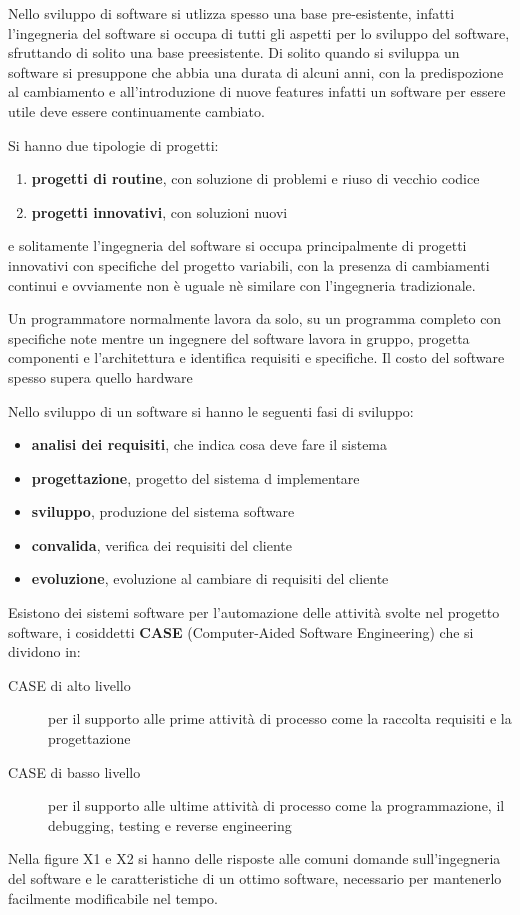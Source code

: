 \documentclass[a4paper,12pt, oneside]{book}
\begin{document}
Nello sviluppo di software si utlizza spesso una base pre-esistente, infatti l'ingegneria del software si occupa
di tutti gli aspetti per lo sviluppo del software, sfruttando di solito una base preesistente. \newline
Di solito quando si sviluppa un software si presuppone che abbia una durata di alcuni anni, con la predispozione
al cambiamento e all'introduzione di nuove features infatti un software per essere utile deve essere continuamente cambiato.

Si hanno due tipologie di progetti:
\begin{enumerate}
        \item \textbf{progetti di routine}, con soluzione di problemi e riuso di vecchio codice
        \item \textbf{progetti innovativi}, con soluzioni nuovi
\end{enumerate}
e solitamente l'ingegneria del software si occupa principalmente di progetti innovativi 
con specifiche del progetto variabili, con la presenza di cambiamenti continui e ovviamente 
non è uguale nè similare con l'ingegneria tradizionale.

Un programmatore normalmente lavora da solo, su un programma completo con specifiche note mentre un ingegnere del software
lavora in gruppo, progetta componenti e l'architettura e identifica requisiti e specifiche.
Il costo del software spesso supera quello hardware %

Nello sviluppo di un software si hanno le seguenti fasi di sviluppo:
\begin{itemize}
    \item \textbf{analisi dei requisiti}, che indica cosa deve fare il sistema
    \item \textbf{progettazione}, progetto del sistema d implementare 
    \item \textbf{sviluppo}, produzione del sistema software
    \item \textbf{convalida}, verifica dei requisiti del cliente
    \item \textbf{evoluzione}, evoluzione al cambiare di requisiti del cliente
\end{itemize} 
Esistono dei sistemi software per l'automazione delle attività svolte nel progetto software, 
i cosiddetti \textbf{CASE} (Computer-Aided Software Engineering) che si dividono in:
\begin{description}
    \item [CASE di alto livello] per il supporto alle prime attività di processo come la raccolta requisiti e la progettazione
    \item [CASE di basso livello] per il supporto alle ultime attività di processo come la programmazione,
                                  il debugging, testing e reverse engineering
\end{description}
Nella figure X1 e X2  si hanno delle risposte alle comuni domande sull'ingegneria del software e le caratteristiche
di un ottimo software, necessario per mantenerlo facilmente modificabile nel tempo.
\end{document}
